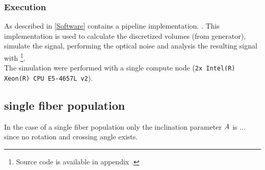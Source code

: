 \subsubsection{Execution}
% 
As described in \cref{Software} \fastpli{} contains a pipeline implementation. \dummy{}.
This implementation is used to calculate the discretized volumes (from generator), simulate the signal, performing the optical noise and analysis the resulting signal with \rofl{}\footnote{Source code is available in appendix \dummy{}.}.
\\
% 
The simulation were performed with a single compute node (\texttt{2x Intel(R) Xeon(R) CPU E5-4657L v2}).
% 
% 
% 
\subsection{single fiber population}
% 
In the case of a single fiber population only the inclination parameter $\textnormal{$A$}{}$ is ... since no rotation and crossing angle exists.
% 
% 
% 
